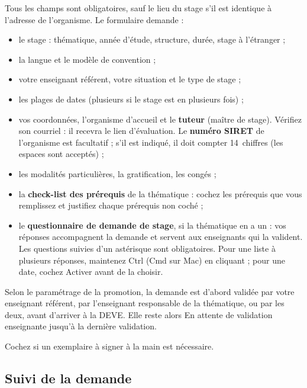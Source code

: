 \documentclass[11pt,a4paper]{article}
\begin{document}
Tous les champs sont obligatoires, sauf le lieu du stage s'il est identique à
l'adresse de l'organisme. Le formulaire demande :
\begin{itemize}
  \item le stage : thématique, année d'étude, structure, durée, stage à
        l'étranger ;
  \item la langue et le modèle de convention ;
  \item votre enseignant référent, votre situation et le type de stage ;
  \item les plages de dates (plusieurs si le stage est en plusieurs fois) ;
  \item vos coordonnées, l'organisme d'accueil et le \textbf{tuteur}
        (maître de stage). Vérifiez son courriel : il recevra le lien
        d'évaluation. Le \textbf{numéro SIRET} de l'organisme est facultatif ;
        s'il est indiqué, il doit compter 14~chiffres (les espaces sont acceptés) ;
  \item les modalités particulières, la gratification, les congés ;
  \item la \textbf{check-list des prérequis} de la thématique : cochez les
        prérequis que vous remplissez et justifiez chaque prérequis non coché ;
  \item le \textbf{questionnaire de demande de stage}, si la thématique en a un :
        vos réponses accompagnent la demande et servent aux enseignants qui la
        valident. Les questions suivies d'un astérisque sont obligatoires. Pour
        une liste à plusieurs réponses, maintenez Ctrl (Cmd sur Mac) en cliquant ;
        pour une date, cochez \og Activer\fg{} avant de la choisir.
\end{itemize}


Selon le paramétrage de la promotion, la demande est d'abord validée par votre
enseignant référent, par l'enseignant responsable de la thématique, ou par les
deux, avant d'arriver à la DEVE. Elle reste alors \og En attente de validation
enseignante\fg{} jusqu'à la dernière validation.

Cochez  si un exemplaire à signer à la main est
nécessaire.

\subsection{Suivi de la demande}
\end{document}
